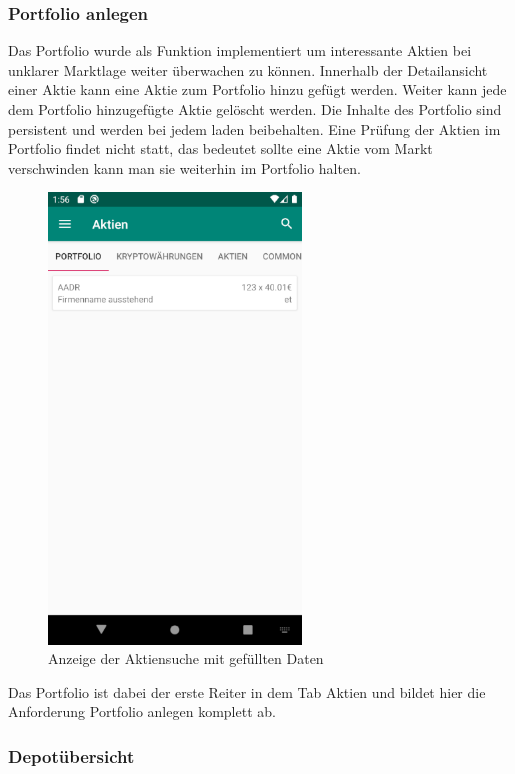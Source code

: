 \documentclass[10pt]{scrartcl}
\begin{document}
\subsubsection{Portfolio anlegen}

Das Portfolio wurde als Funktion implementiert um interessante Aktien bei unklarer Marktlage weiter überwachen zu können. Innerhalb der Detailansicht einer Aktie kann eine Aktie zum Portfolio hinzu gefügt werden. Weiter kann jede dem Portfolio hinzugefügte Aktie gelöscht werden. Die Inhalte des Portfolio sind persistent und werden bei jedem laden beibehalten. Eine Prüfung der Aktien im Portfolio findet nicht statt, das bedeutet sollte eine Aktie vom Markt verschwinden kann man sie weiterhin im Portfolio halten.

\begin{figure}[H]
	\centering
	\includegraphics[width=0.6\textwidth]{Bilder/Prsi/Portfolio.png}
	\caption{Anzeige der Aktiensuche mit gefüllten Daten}
\end{figure}

Das Portfolio ist dabei der erste Reiter in dem Tab Aktien und bildet hier die Anforderung Portfolio anlegen komplett ab.

\subsubsection{Depotübersicht}
\end{document}
